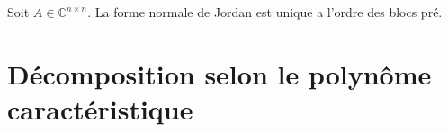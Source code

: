 \begin{corollary}
  \label{cor:32x}
  Soit $A ∈ℂ^{n ×n}$. La forme normale de Jordan est unique a l'ordre des blocs pré. 
\end{corollary}




\section{Décomposition selon le polynôme caractéristique}
\label{sec:decomp-selon-le}












